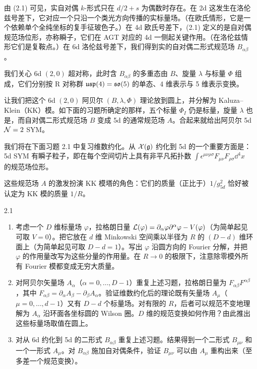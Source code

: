 由 (2.1) 可见，实自对偶 $k$-形式只在 $d/2+s$ 为偶数时存在。在 2d 这发生在洛伦兹号差下，它对应一个只沿一个类光方向传播的实标量场。（在欧氏情形，它是一个依赖单个全纯坐标的复手征玻色子。）在 4d 欧氏号差下，(2.1) 定义的是自对偶规范场位形，亦称瞬子，它们在 AGT 对应的 4d 一侧起关键作用。（在洛伦兹情形它们是复鞍点。）在 6d 洛伦兹号差下，我们得到实的自对偶二形式规范场 $B_{\alpha\beta}$。

我们关心 6d $(2,0)$ 超对称，此时含 $B_{\alpha\beta}$ 的多重态由 $B$、旋量 $\lambda$ 与标量 $\Phi$ 组成，它们分别按 R 对称群 $\mathfrak{usp}(4)=\mathfrak{so}(5)$ 的单态、4 维表示与 5 维表示变换。

让我们把这个 6d $(2,0)$ 阿贝尔 $(B,\lambda,\Phi)$ 理论放到圆上，并分解为 Kaluza--Klein（KK）模。如下面的习题所确定的那样，五个标量 $\Phi_I$ 仍是标量，旋量 $\lambda$ 也是，而自对偶二形式规范场 $B$ 变成 5d 的通常规范场 $A$。合起来就给出阿贝尔 5d $\mathcal{N}=2$ SYM。

我们将在下面习题 2.1 中复习维数约化。从 $\mathcal{X}(\mathfrak{g})$ 约化到 5d 的一个重要方面是：5d SYM 有瞬子粒子，即在每个空间切片上具有非平凡拓扑数 $\int\epsilon^{\mu\nu\rho\sigma}F_{\mu\nu}F_{\rho\sigma}\dd^4x$ 的规范场位形。


这些规范场 $A$ 的激发扮演 KK 模塔的角色：它们的质量（正比于）$1/g_{5d}^2$ 恰好被认定为 KK 模的质量 $1/R$。

\begin{exercise}{2.1}
\begin{enumerate}[label=\arabic*.,leftmargin=1.6em,itemsep=2pt,topsep=4pt]
\item 考虑一个 $D$ 维标量场 $\varphi$，拉格朗日量 $\mathcal{L}(\varphi)=\partial_\alpha\varphi\partial^\alpha\varphi-V(\varphi)$（为简单起见可取 $V=0$）。把它放在 $d$ 维 Minkowski 空间乘以半径为 $R$ 的 $(D-d)$ 维环面上（为简单起见可取 $D-d=1$）。写出 $\varphi$ 沿圆方向的 Fourier 分解，并把 $\varphi$ 的作用量改写为这些分量的作用量。在 $R\to 0$ 的极限下，注意除零模外所有 Fourier 模都变成无穷大质量。
\item 对阿贝尔矢量场 $A_\alpha$（$\alpha=0,\dots,D-1$）重复上述习题，拉格朗日量为 $F_{\alpha\beta}F^{\alpha\beta}$，其中 $F_{\alpha\beta}=\partial_\alpha A_\beta-\partial_\beta A_\alpha$。验证维数约化后的理论既有矢量场 $A_\mu$（$\mu=0,\dots,d-1$）又有 $D-d$ 个标量场。对有限的 $R$，后者可以规范不变地理解为 $A_\alpha$ 沿环面各坐标圆的 Wilson 圈。$D$ 维的规范变换如何作用？由此推出这些标量场取值在圆上。
\item 对从 6d 约化到 5d 的二形式 $B_{\alpha\beta}$ 重复上述习题。结果得到一个二形式 $B_{\mu\nu}$ 和一个一形式 $A_\mu$。对 $B_{\alpha\beta}$ 施加自对偶条件，验证 $B_{\mu\nu}$ 可以由 $A_\mu$ 重构出来（至多差一个规范变换）。
\end{enumerate}
\end{exercise}

